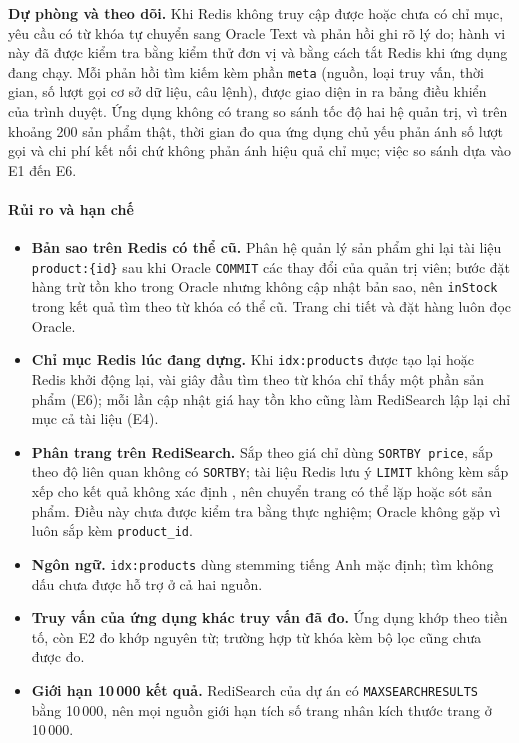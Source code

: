 \noindent\textbf{Dự phòng và theo dõi.} Khi Redis không truy cập được hoặc chưa có chỉ mục, yêu cầu có từ khóa tự chuyển sang Oracle Text và phản hồi ghi rõ lý do; hành vi này đã được kiểm tra bằng kiểm thử đơn vị và bằng cách tắt Redis khi ứng dụng đang chạy. Mỗi phản hồi tìm kiếm kèm phần \texttt{meta} (nguồn, loại truy vấn, thời gian, số lượt gọi cơ sở dữ liệu, câu lệnh), được giao diện in ra bảng điều khiển của trình duyệt. Ứng dụng không có trang so sánh tốc độ hai hệ quản trị, vì trên khoảng 200 sản phẩm thật, thời gian đo qua ứng dụng chủ yếu phản ánh số lượt gọi và chi phí kết nối chứ không phản ánh hiệu quả chỉ mục; việc so sánh dựa vào E1 đến E6.

\paragraph{Rủi ro và hạn chế}\label{sec:ix-risks}

\begin{itemize}[label=--,leftmargin=*,itemsep=2pt,topsep=4pt]
    \item \textbf{Bản sao trên Redis có thể cũ.} Phân hệ quản lý sản phẩm ghi lại tài liệu \texttt{product:\{id\}} sau khi Oracle \texttt{COMMIT} các thay đổi của quản trị viên; bước đặt hàng trừ tồn kho trong Oracle nhưng không cập nhật bản sao, nên \texttt{inStock} trong kết quả tìm theo từ khóa có thể cũ. Trang chi tiết và đặt hàng luôn đọc Oracle.
    \item \textbf{Chỉ mục Redis lúc đang dựng.} Khi \texttt{idx:products} được tạo lại hoặc Redis khởi động lại, vài giây đầu tìm theo từ khóa chỉ thấy một phần sản phẩm (E6); mỗi lần cập nhật giá hay tồn kho cũng làm RediSearch lập lại chỉ mục cả tài liệu (E4).
    \item \textbf{Phân trang trên RediSearch.} Sắp theo giá chỉ dùng \texttt{SORTBY price}, sắp theo độ liên quan không có \texttt{SORTBY}; tài liệu Redis lưu ý \texttt{LIMIT} không kèm sắp xếp cho kết quả không xác định \cite{redisFtSearch}, nên chuyển trang có thể lặp hoặc sót sản phẩm. Điều này chưa được kiểm tra bằng thực nghiệm; Oracle không gặp vì luôn sắp kèm \texttt{product\_id}.
    \item \textbf{Ngôn ngữ.} \texttt{idx:products} dùng stemming tiếng Anh mặc định; tìm không dấu chưa được hỗ trợ ở cả hai nguồn.
    \item \textbf{Truy vấn của ứng dụng khác truy vấn đã đo.} Ứng dụng khớp theo tiền tố, còn E2 đo khớp nguyên từ; trường hợp từ khóa kèm bộ lọc cũng chưa được đo.
    \item \textbf{Giới hạn 10\,000 kết quả.} RediSearch của dự án có \texttt{MAXSEARCHRESULTS} bằng 10\,000, nên mọi nguồn giới hạn tích số trang nhân kích thước trang ở 10\,000.
\end{itemize}

